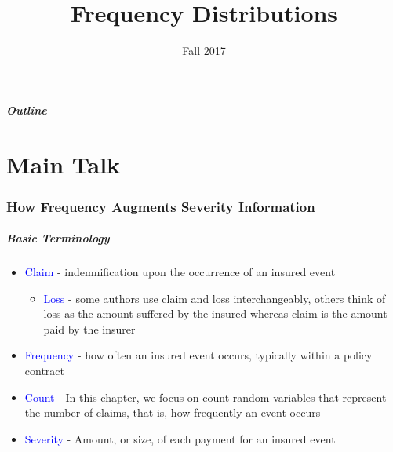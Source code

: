 \documentclass{beamer}
\title[Frequency]{Frequency Distributions}
\date[Fall 2017]{Fall 2017}
\begin{document}
\frame{\titlepage}

\begin{frame}
  \frametitle{Outline}
     \tableofcontents[part=1]
\end{frame}

\part<presentation>{Main Talk}


\section{How Frequency Augments Severity Information}

\begin{frame}%
 \frametitle{Basic Terminology}
\begin{itemize}
   \item \textcolor{blue}{Claim} - indemnification upon the occurrence of an insured
   event \vspace{2mm}
   \begin{itemize}
   \item \textcolor{blue}{Loss} - some authors use claim and loss interchangeably, others think of loss as the amount suffered by the insured whereas claim is the amount paid by the
   insurer \vspace{2mm}
 \end{itemize}
    \item \textcolor{blue}{Frequency} - how often an insured event occurs, typically within a policy
    contract \vspace{2mm}
    \item \textcolor{blue}{Count} - In this chapter, we focus on count random variables that represent the number of claims, that is, how frequently an event
    occurs \vspace{2mm}
   \item \textcolor{blue}{Severity} - Amount, or size, of each payment for an insured event
 \end{itemize}
\end{frame}
\end{document}
